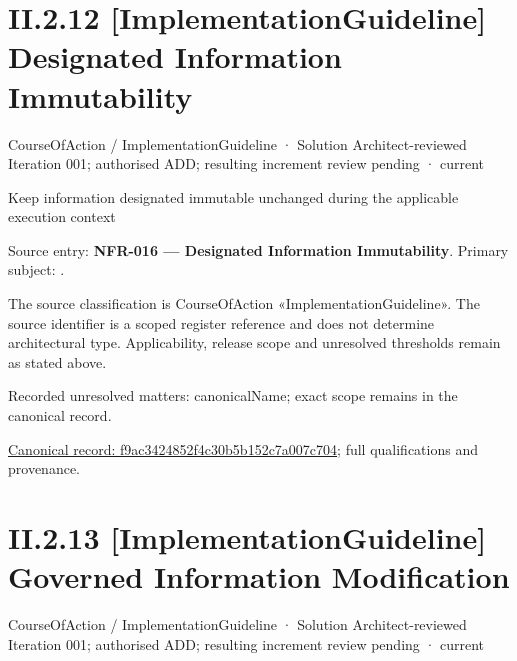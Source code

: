 \section*{II.2.12 [ImplementationGuideline] Designated Information Immutability}
\label{navigation:II.2.12}

\label{element:f9ac3424852f4c30b5b152c7a007c704}
{\small CourseOfAction / ImplementationGuideline · Solution Architect-reviewed Iteration 001; authorised ADD; resulting increment review pending · current}\par

Keep information designated immutable unchanged during the applicable execution context



Source entry: \textbf{NFR-016 — Designated Information Immutability}. Primary subject: \texttt{}.



The source classification is CourseOfAction «ImplementationGuideline». The source identifier is a scoped register reference and does not determine architectural type. Applicability, release scope and unresolved thresholds remain as stated above.


{\small Recorded unresolved matters: canonicalName; exact scope remains in the canonical record.}\par
{\footnotesize \href{../../../../../../../continuum/strategy/course-of-action/implementation-guideline/f9ac3424852f4c30b5b152c7a007c704.md}{Canonical record: f9ac3424852f4c30b5b152c7a007c704}; full qualifications and provenance.}\par
\section*{II.2.13 [ImplementationGuideline] Governed Information Modification}
\label{navigation:II.2.13}

\label{element:d08bf41d719c43e3bc1a54bd79d95741}
{\small CourseOfAction / ImplementationGuideline · Solution Architect-reviewed Iteration 001; authorised ADD; resulting increment review pending · current}\par

